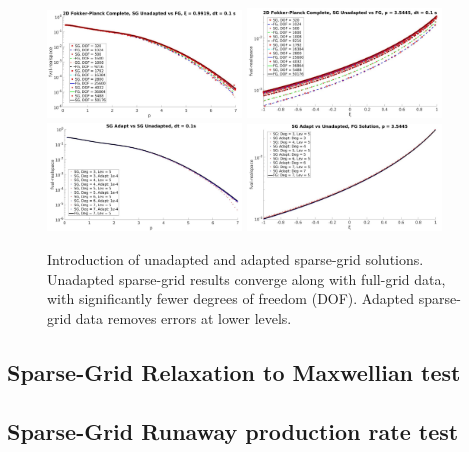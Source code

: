 \documentclass[preprint,11pt]{elsarticle}
\begin{document}
\begin{figure}[H]
\includegraphics[width=0.46\textwidth]{FIGURES/SG_FG_2DComplete_UnadaptSG_FGcompare.jpg}
\includegraphics[width=0.46\textwidth]{FIGURES/SG_FG_2DComplete_vert_UnadaptSG_FGcompare.jpg}
\includegraphics[width=0.46\textwidth]{FIGURES/SG_FG_2DComplete_AdaptSG_FGcompare.jpg}
\includegraphics[width=0.46\textwidth]{FIGURES/SG_FG_vert_2DComplete_AdaptSG_FGcompare.jpg}
\caption{Introduction of unadapted and adapted sparse-grid solutions. Unadapted sparse-grid results converge along with full-grid data, with significantly fewer degrees of freedom (DOF). Adapted sparse-grid data removes errors at lower levels.}
\label{fig:2DFP_SGFG_Complete}
\end{figure}


\subsection{Sparse-Grid Relaxation to Maxwellian test}


\subsection{Sparse-Grid Runaway production rate test}
\end{document}
